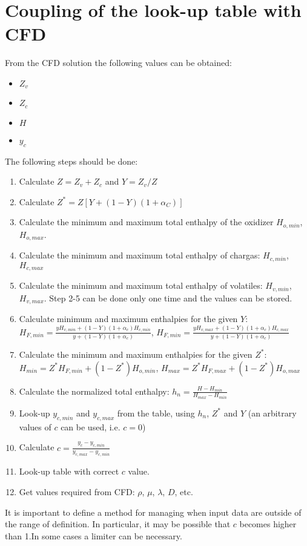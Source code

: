 \documentclass[]{scrartcl}
\begin{document}
\section{Coupling of the look-up table with CFD}
From the CFD solution the following values can be obtained:
\begin{itemize}
\item $Z_v$
\item $Z_c$
\item $H$
\item $y_c$
\end{itemize}

The following steps should be done:
\begin{enumerate}
\item Calculate 
$Z=Z_v+Z_c$ and $Y=Z_v/Z$
\item Calculate $Z^* =Z \left[Y+(1-Y)(1+\alpha_C)\right]$
\item Calculate the minimum and maximum total enthalpy of the oxidizer $H_{o,min}$, $H_{o,max}$. 
\item Calculate the minimum and maximum total enthalpy of chargas: $H_{c,min}$, $H_{c,max}$
\item Calculate the minimum and maximum total enthalpy of volatiles: $H_{v,min}$, $H_{v,max}$. Step 2-5 can be done only one time and the values can be stored.
\item Calculate minimum and maximum enthalpies for the given $Y$:\\ $H_{F,min} = \frac{y H_{v,min}+(1-Y)(1+\alpha_c)H_{c,min}}{y + (1-Y)(1+\alpha_c)}$, $H_{F,min} = \frac{y H_{v,max}+(1-Y)(1+\alpha_c)H_{c,max}}{y + (1-Y)(1+\alpha_c)}$
\item  Calculate the minimum and maximum enthalpies for the given $Z^*$: $H_{min} = Z^* H_{F,min}+(1-Z^*)H_{o,min}$, $H_{max} = Z^* H_{F,max}+(1-Z^*)H_{o,max}$
\item Calculate the normalized total enthalpy: $h_n = \frac{H - H_{min}}{H_{max}-H_{min}}$
\item Look-up $y_{c, min}$ and $ y_{c, max}$ from the table, using $h_n$, $Z^*$ and $Y$ (an arbitrary values of $c$ can be used, i.e. $c=0$)
\item Calculate $c = \frac{y_c - y_{c,min}}{y_{c,max}-y_{c,min}}$
\item Look-up table with correct $c$ value.
\item Get values required from CFD: $\rho$, $\mu$, $\lambda$, $D$, etc.

\end{enumerate}

It is important to define a method for managing when input data are outside of the range of definition.
In particular, it may be possible that $c$ becomes higher than 1.In some cases a limiter can be necessary.
\end{document}
